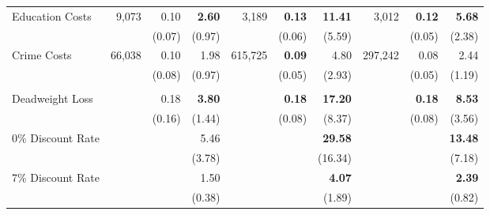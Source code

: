 \begin{tabular}{l r r r r r r r r r}
Education Costs	&	9,073	&	0.10	&	\textbf{2.60}	&	3,189	&	\textbf{0.13}	&	\textbf{11.41}	&	3,012	&	\textbf{0.12}	&	\textbf{5.68}	\\
	&		&	(0.07)	&	(0.97)	&		&	(0.06)	&	(5.59)	&		&	(0.05)	&	(2.38)	\\
Crime Costs	&	66,038	&	0.10	&	1.98	&	615,725	&	\textbf{0.09}	&	4.80	&	297,242	&	0.08	&	2.44	\\
	&		&	(0.08)	&	(0.97)	&		&	(0.05)	&	(2.93)	&		&	(0.05)	&	(1.19)	\\ \\
Deadweight Loss	&		&	0.18	&	\textbf{3.80}	&		&	\textbf{0.18}	&	\textbf{17.20}	&		&	\textbf{0.18}	&	\textbf{8.53}	\\
	&		&	(0.16)	&	(1.44)	&		&	(0.08)	&	(8.37)	&		&	(0.08)	&	(3.56)	\\
0\% Discount Rate	&		&		&	5.46	&		&		&	\textbf{29.58}	&		&		&	\textbf{13.48}	\\
	&		&		&	(3.78)	&		&		&	(16.34)	&		&		&	(7.18)	\\
7\% Discount Rate	&		&		&	1.50	&		&		&	\textbf{4.07}	&		&		&	\textbf{2.39}	\\
	&		&		&	(0.38)	&		&		&	(1.89)	&		&		&	(0.82)	\\

\bottomrule																			
\end{tabular}																			
